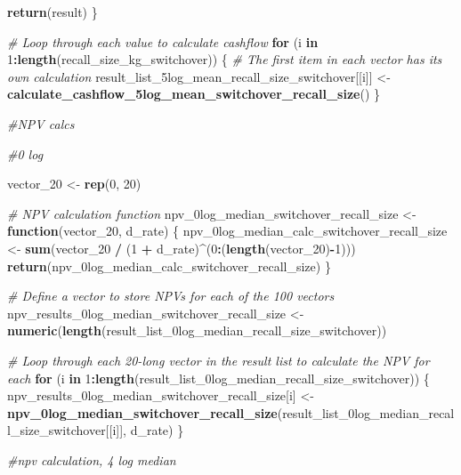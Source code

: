 \documentclass[
]{article}
\newenvironment{Shaded}{\begin{snugshade}}{\end{snugshade}}
\newcommand{\CommentTok}[1]{\textcolor[rgb]{0.56,0.35,0.01}{\textit{#1}}}
\newcommand{\ControlFlowTok}[1]{\textcolor[rgb]{0.13,0.29,0.53}{\textbf{#1}}}
\newcommand{\DecValTok}[1]{\textcolor[rgb]{0.00,0.00,0.81}{#1}}
\newcommand{\FunctionTok}[1]{\textcolor[rgb]{0.13,0.29,0.53}{\textbf{#1}}}
\newcommand{\NormalTok}[1]{#1}
\newcommand{\OtherTok}[1]{\textcolor[rgb]{0.56,0.35,0.01}{#1}}
\newcommand{\SpecialCharTok}[1]{\textcolor[rgb]{0.81,0.36,0.00}{\textbf{#1}}}
\begin{document}
\begin{Shaded}
\begin{Highlighting}[]
  \FunctionTok{return}\NormalTok{(result)}
\NormalTok{\}}

\CommentTok{\# Loop through each value to calculate cashflow}
\ControlFlowTok{for}\NormalTok{ (i }\ControlFlowTok{in} \DecValTok{1}\SpecialCharTok{:}\FunctionTok{length}\NormalTok{(recall\_size\_kg\_switchover)) \{}
  \CommentTok{\# The first item in each vector has its own calculation}
\NormalTok{  result\_list\_5log\_mean\_recall\_size\_switchover[[i]] }\OtherTok{\textless{}{-}} \FunctionTok{calculate\_cashflow\_5log\_mean\_switchover\_recall\_size}\NormalTok{()}
\NormalTok{\}}


\CommentTok{\#NPV calcs}

\CommentTok{\#0 log }

\NormalTok{vector\_20 }\OtherTok{\textless{}{-}} \FunctionTok{rep}\NormalTok{(}\DecValTok{0}\NormalTok{, }\DecValTok{20}\NormalTok{)}

\CommentTok{\# NPV calculation function}
\NormalTok{npv\_0log\_median\_switchover\_recall\_size }\OtherTok{\textless{}{-}} \ControlFlowTok{function}\NormalTok{(vector\_20, d\_rate) \{}
\NormalTok{  npv\_0log\_median\_calc\_switchover\_recall\_size }\OtherTok{\textless{}{-}} \FunctionTok{sum}\NormalTok{(vector\_20 }\SpecialCharTok{/}\NormalTok{ (}\DecValTok{1} \SpecialCharTok{+}\NormalTok{ d\_rate)}\SpecialCharTok{\^{}}\NormalTok{(}\DecValTok{0}\SpecialCharTok{:}\NormalTok{(}\FunctionTok{length}\NormalTok{(vector\_20)}\SpecialCharTok{{-}}\DecValTok{1}\NormalTok{)))}
  \FunctionTok{return}\NormalTok{(npv\_0log\_median\_calc\_switchover\_recall\_size)}
\NormalTok{\}}

\CommentTok{\# Define a vector to store NPVs for each of the 100 vectors}
\NormalTok{npv\_results\_0log\_median\_switchover\_recall\_size }\OtherTok{\textless{}{-}} \FunctionTok{numeric}\NormalTok{(}\FunctionTok{length}\NormalTok{(result\_list\_0log\_median\_recall\_size\_switchover))}

\CommentTok{\# Loop through each 20{-}long vector in the result list to calculate the NPV for each}
\ControlFlowTok{for}\NormalTok{ (i }\ControlFlowTok{in} \DecValTok{1}\SpecialCharTok{:}\FunctionTok{length}\NormalTok{(result\_list\_0log\_median\_recall\_size\_switchover)) \{}
\NormalTok{  npv\_results\_0log\_median\_switchover\_recall\_size[i] }\OtherTok{\textless{}{-}} \FunctionTok{npv\_0log\_median\_switchover\_recall\_size}\NormalTok{(result\_list\_0log\_median\_recall\_size\_switchover[[i]], d\_rate)}
\NormalTok{\}}


\CommentTok{\#npv calculation, 4 log median}



\end{Highlighting}
\end{Shaded}
\end{document}
